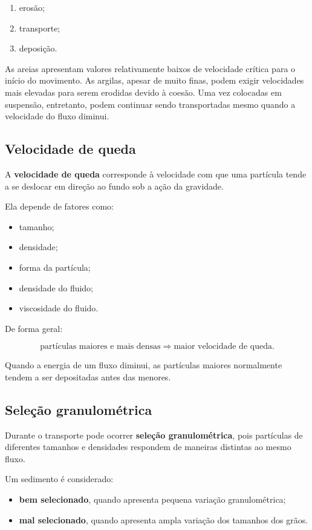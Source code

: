 \begin{enumerate}
    \item erosão;
    \item transporte;
    \item deposição.
\end{enumerate}

As areias apresentam valores relativamente baixos de velocidade crítica para o
início do movimento. As argilas, apesar de muito finas, podem exigir velocidades
mais elevadas para serem erodidas devido à coesão. Uma vez colocadas em
suspensão, entretanto, podem continuar sendo transportadas mesmo quando a
velocidade do fluxo diminui.

\subsection{Velocidade de queda}

A \textbf{velocidade de queda} corresponde à velocidade com que uma partícula
tende a se deslocar em direção ao fundo sob a ação da gravidade.

Ela depende de fatores como:

\begin{itemize}
    \item tamanho;
    \item densidade;
    \item forma da partícula;
    \item densidade do fluido;
    \item viscosidade do fluido.
\end{itemize}

De forma geral:

\[
\text{partículas maiores e mais densas}
\Rightarrow
\text{maior velocidade de queda}.
\]

Quando a energia de um fluxo diminui, as partículas maiores normalmente tendem
a ser depositadas antes das menores.

\subsection{Seleção granulométrica}

Durante o transporte pode ocorrer \textbf{seleção granulométrica}, pois partículas
de diferentes tamanhos e densidades respondem de maneiras distintas ao mesmo
fluxo.

Um sedimento é considerado:

\begin{itemize}
    \item \textbf{bem selecionado}, quando apresenta pequena variação granulométrica;
    \item \textbf{mal selecionado}, quando apresenta ampla variação dos tamanhos dos grãos.
\end{itemize}

